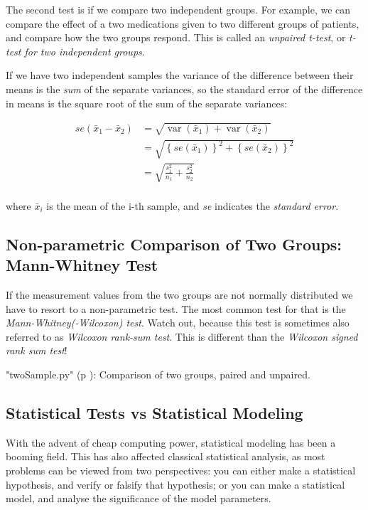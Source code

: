 The second test is if we compare two independent groups. For example, we can compare the effect of a two medications given to two different groups of patients, and compare how the two groups respond. This is called an \emph{unpaired t-test}, or \emph{t-test for two independent groups}.

If we have two independent samples the variance of the difference between their means is the \emph{sum} of the separate variances, so the standard error of the difference in means is the square root of the sum of the separate variances:

\begin{align*}
   se({{\bar x}_1} - {{\bar x}_2}) &= \sqrt {\operatorname{var} ({{\bar x}_1}) + \operatorname{var} ({{\bar x}_2})}  \\
   &= \sqrt {{{\left\{ {se({{\bar x}_1})} \right\}}^2} + {{\left\{ {se({{\bar x}_2})} \right\}}^2}}  \\
   &= \sqrt {\frac{{s_1^2}}{{{n_1}}} + \frac{{s_2^2}}{{{n_2}}}}  \\
\end{align*}

where $\bar{x}_i$ is the mean of the i-th sample, and \emph{se} indicates the \emph{standard error}.

\subsection{Non-parametric Comparison of Two Groups: Mann-Whitney Test} \label{test:Mann-Whitney}

If the measurement values from the two groups are not normally distributed we have to resort to a non-parametric test. The most common test for that is the \emph{Mann-Whitney(-Wilcoxon) test}. Watch out, because this test is sometimes also referred to as \emph{Wilcoxon rank-sum test}. This is different than the \emph{Wilcoxon signed rank sum test}!

\PyImg "twoSample.py" (p \pageref{py:twoSample}): Comparison of two groups, paired and unpaired.

\subsection{Statistical Tests vs Statistical Modeling}

With the advent of cheap computing power, statistical modeling has been a booming field. This has also affected classical statistical analysis, as most problems can be viewed from two perspectives: you can either make a statistical hypothesis, and verify or falsify that hypothesis; or you can make a statistical model, and analyse the significance of the model parameters.

